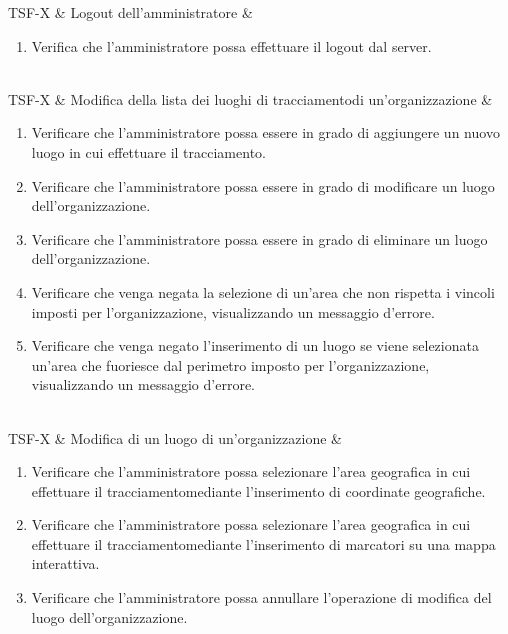 TSF-X & Logout dell'amministratore & \begin{enumerate}
    \item Verifica che l'amministratore possa effettuare il logout dal server.
\end{enumerate} \\

TSF-X & Modifica della lista dei luoghi di tracciamentodi un'organizzazione & \begin{enumerate}
    \item Verificare che l'amministratore possa essere in grado di aggiungere un nuovo luogo in cui effettuare il tracciamento.
    \item Verificare che l'amministratore possa essere in grado di modificare un luogo dell'organizzazione.
    \item Verificare che l'amministratore possa essere in grado di eliminare un luogo dell'organizzazione.
    \item Verificare che venga negata la selezione di un'area che non rispetta i vincoli imposti per l'organizzazione, visualizzando un messaggio d'errore.
    \item Verificare che venga negato l'inserimento di un luogo se viene selezionata un'area che fuoriesce dal perimetro imposto per l'organizzazione, visualizzando un messaggio d'errore.
\end{enumerate} \\

TSF-X & Modifica di un luogo di un'organizzazione & \begin{enumerate}
    \item Verificare che l'amministratore possa selezionare l'area geografica in cui effettuare il tracciamentomediante l'inserimento di coordinate geografiche.
    \item Verificare che l'amministratore possa selezionare l'area geografica in cui effettuare il tracciamentomediante l'inserimento di marcatori su una mappa interattiva.
    \item Verificare che l'amministratore possa annullare l'operazione di modifica del luogo dell'organizzazione.
\end{enumerate} \\


